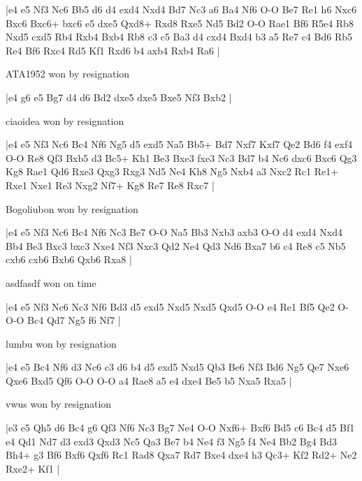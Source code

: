 \makegametitle
|e4 e5 Nf3 Nc6 Bb5 d6 d4 exd4 Nxd4 Bd7 Nc3 a6 Ba4 Nf6 O-O Be7 Re1 h6 Nxc6 Bxc6 Bxc6+ bxc6 e5 dxe5 Qxd8+ Rxd8 Rxe5 Nd5 Bd2 O-O Rae1 Bf6 R5e4 Rb8 Nxd5 cxd5 Rb4 Rxb4 Bxb4 Rb8 c3 c5 Ba3 d4 cxd4 Bxd4 b3 a5 Re7 c4 Bd6 Rb5 Re4 Bf6 Rxc4 Rd5 Kf1 Rxd6 b4 axb4 Rxb4 Ra6  |

\showboard

ATA1952 won by resignation

\makegametitle
|e4 g6 e5 Bg7 d4 d6 Bd2 dxe5 dxe5 Bxe5 Nf3 Bxb2  |

\showboard

ciaoidea won by resignation

\makegametitle
|e4 e5 Nf3 Nc6 Bc4 Nf6 Ng5 d5 exd5 Na5 Bb5+ Bd7 Nxf7 Kxf7 Qe2 Bd6 f4 exf4 O-O Re8 Qf3 Bxb5 d3 Bc5+ Kh1 Be3 Bxe3 fxe3 Nc3 Bd7 b4 Nc6 dxc6 Bxc6 Qg3 Kg8 Rae1 Qd6 Rxe3 Qxg3 Rxg3 Nd5 Ne4 Kh8 Ng5 Nxb4 a3 Nxc2 Rc1 Re1+ Rxe1 Nxe1 Re3 Nxg2 Nf7+ Kg8 Re7 Re8 Rxc7  |

\showboard

Bogoliubon won by resignation

\makegametitle
|e4 e5 Nf3 Nc6 Bc4 Nf6 Nc3 Be7 O-O Na5 Bb3 Nxb3 axb3 O-O d4 exd4 Nxd4 Bb4 Be3 Bxc3 bxc3 Nxe4 Nf3 Nxc3 Qd2 Ne4 Qd3 Nd6 Bxa7 b6 c4 Re8 c5 Nb5 cxb6 cxb6 Bxb6 Qxb6 Rxa8  |

\showboard

asdfasdf won on time

\makegametitle
|e4 e5 Nf3 Nc6 Nc3 Nf6 Bd3 d5 exd5 Nxd5 Nxd5 Qxd5 O-O e4 Re1 Bf5 Qe2 O-O-O Bc4 Qd7 Ng5 f6 Nf7  |

\showboard

lumbu won by resignation

\makegametitle
|e4 e5 Bc4 Nf6 d3 Nc6 c3 d6 b4 d5 exd5 Nxd5 Qb3 Be6 Nf3 Bd6 Ng5 Qe7 Nxe6 Qxe6 Bxd5 Qf6 O-O O-O a4 Rae8 a5 e4 dxe4 Be5 b5 Nxa5 Rxa5  |

\showboard

vwus won by resignation

\makegametitle
|e3 e5 Qh5 d6 Bc4 g6 Qf3 Nf6 Nc3 Bg7 Ne4 O-O Nxf6+ Bxf6 Bd5 c6 Bc4 d5 Bf1 e4 Qd1 Nd7 d3 exd3 Qxd3 Nc5 Qa3 Be7 b4 Ne4 f3 Ng5 f4 Ne4 Bb2 Bg4 Bd3 Bh4+ g3 Bf6 Bxf6 Qxf6 Rc1 Rad8 Qxa7 Rd7 Bxe4 dxe4 h3 Qc3+ Kf2 Rd2+ Ne2 Rxe2+ Kf1  |

